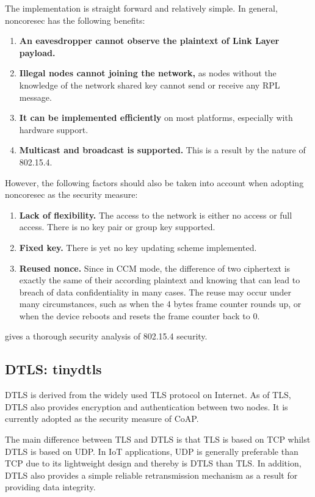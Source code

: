 The implementation is straight forward and relatively simple. In general, noncoresec has the following benefits:
\begin{enumerate}
\item \textbf{An eavesdropper cannot observe the plaintext of Link Layer payload.}
\item \textbf{Illegal nodes cannot joining the network,} as nodes without the knowledge of the network shared key cannot send or receive any RPL message.
\item \textbf{It can be implemented efficiently} on most platforms, especially with hardware support.
\item \textbf{Multicast and broadcast is supported.} This is a result by the nature of 802.15.4.
\end{enumerate}

However, the following factors should also be taken into account  when adopting noncoresec as the security measure:
\begin{enumerate}
\item \textbf{Lack of flexibility.} The access to the network is either no access or full access. There is no key pair or group key supported.
\item \textbf{Fixed key.} There is yet no key updating scheme implemented. 
\item \textbf{Reused nonce.} Since in CCM mode, the difference of two ciphertext is exactly the same of their according plaintext and knowing that can lead to breach of data confidentiality in many cases. The reuse may occur under many circumstances, such as when the 4 bytes frame counter rounds up, or when the device reboots and resets the frame counter back to $0$.
\end{enumerate}

\cite{802154sec} gives a thorough security analysis of 802.15.4 security.

\subsection{DTLS: tinydtls}
DTLS is derived from the widely used TLS protocol on Internet. As of TLS, DTLS also provides encryption and authentication between two nodes. It is currently adopted as the security measure of CoAP.

The main difference between TLS and DTLS is that TLS is based on TCP whilst DTLS is based on UDP. In IoT applications, UDP is generally preferable than TCP due to its lightweight design and thereby is DTLS  than TLS. In addition, DTLS also provides a simple reliable retransmission mechanism as a result for providing data integrity.

